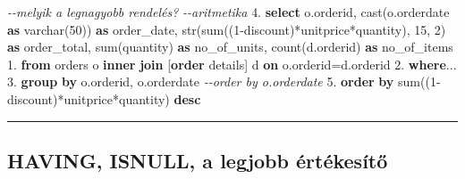 \documentclass[
  magyar,
]{article}
\newenvironment{Shaded}{}{}
\newcommand{\CommentTok}[1]{\textcolor[rgb]{0.38,0.63,0.69}{\textit{#1}}}
\newcommand{\DataTypeTok}[1]{\textcolor[rgb]{0.56,0.13,0.00}{#1}}
\newcommand{\DecValTok}[1]{\textcolor[rgb]{0.25,0.63,0.44}{#1}}
\newcommand{\FloatTok}[1]{\textcolor[rgb]{0.25,0.63,0.44}{#1}}
\newcommand{\FunctionTok}[1]{\textcolor[rgb]{0.02,0.16,0.49}{#1}}
\newcommand{\KeywordTok}[1]{\textcolor[rgb]{0.00,0.44,0.13}{\textbf{#1}}}
\newcommand{\NormalTok}[1]{#1}
\newcommand{\OperatorTok}[1]{\textcolor[rgb]{0.40,0.40,0.40}{#1}}
\begin{document}
\begin{Shaded}
\begin{Highlighting}[]
\CommentTok{{-}{-}melyik a legnagyobb rendelés?}
\CommentTok{{-}{-}aritmetika}
\FloatTok{4.} \KeywordTok{select}\NormalTok{ o.orderid,}
 \FunctionTok{cast}\NormalTok{(o.orderdate }\KeywordTok{as} \DataTypeTok{varchar}\NormalTok{(}\DecValTok{50}\NormalTok{)) }\KeywordTok{as}\NormalTok{ order\_date,}
\NormalTok{ str(}\FunctionTok{sum}\NormalTok{((}\DecValTok{1}\OperatorTok{{-}}\NormalTok{discount)}\OperatorTok{*}\NormalTok{unitprice}\OperatorTok{*}\NormalTok{quantity), }\DecValTok{15}\NormalTok{, }\DecValTok{2}\NormalTok{) }\KeywordTok{as}\NormalTok{ order\_total,}
 \FunctionTok{sum}\NormalTok{(quantity) }\KeywordTok{as}\NormalTok{ no\_of\_units,}
 \FunctionTok{count}\NormalTok{(d.orderid) }\KeywordTok{as}\NormalTok{ no\_of\_items}
\FloatTok{1.} \KeywordTok{from}\NormalTok{ orders o }\KeywordTok{inner} \KeywordTok{join}\NormalTok{ [}\KeywordTok{order}\NormalTok{ details] d }\KeywordTok{on}\NormalTok{ o.orderid}\OperatorTok{=}\NormalTok{d.orderid}
\FloatTok{2.} \KeywordTok{where}\OperatorTok{..}\NormalTok{.}
\FloatTok{3.} \KeywordTok{group} \KeywordTok{by}\NormalTok{ o.orderid, o.orderdate}
 \CommentTok{{-}{-}order by o.orderdate}
\FloatTok{5.} \KeywordTok{order} \KeywordTok{by} \FunctionTok{sum}\NormalTok{((}\DecValTok{1}\OperatorTok{{-}}\NormalTok{discount)}\OperatorTok{*}\NormalTok{unitprice}\OperatorTok{*}\NormalTok{quantity) }\KeywordTok{desc}
\end{Highlighting}
\end{Shaded}

\begin{center}\rule{0.5\linewidth}{0.5pt}\end{center}

\subsection{HAVING, ISNULL, a legjobb
értékesítő}\label{having-isnull-a-legjobb-uxe9rtuxe9kesuxedtux151}
\end{document}
